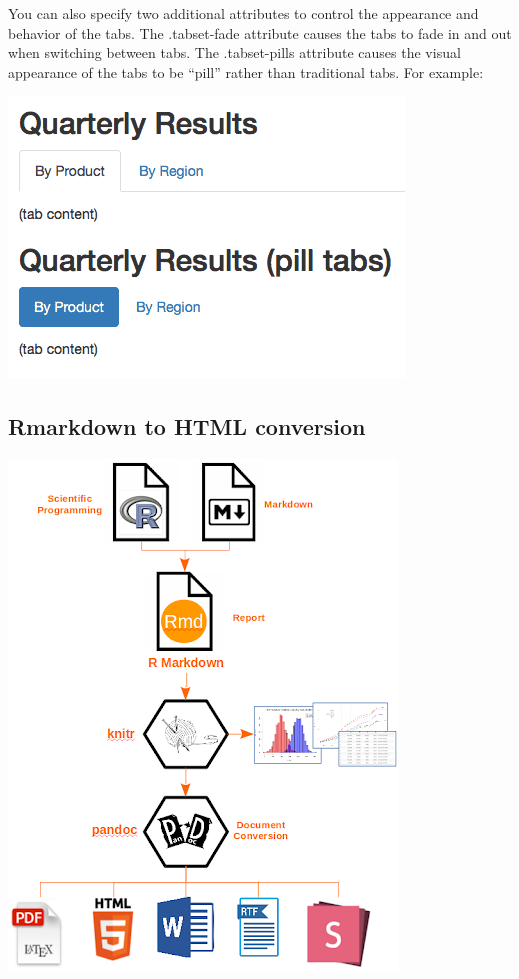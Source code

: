 \documentclass[
]{book}
\begin{document}
You can also specify two additional attributes to control the appearance and behavior of the tabs. The .tabset-fade attribute causes the tabs to fade in and out when switching between tabs. The .tabset-pills attribute causes the visual appearance of the tabs to be ``pill'' rather than traditional tabs. For example:

\includegraphics{img/tabset.png}

\hypertarget{rmarkdown-to-html-conversion}{%
\subsection{Rmarkdown to HTML conversion}\label{rmarkdown-to-html-conversion}}

\includegraphics{img/rmarkdown_html.png}
\end{document}

